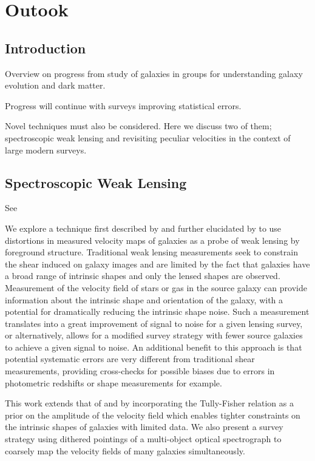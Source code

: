 \chapter{Outook}

\label{chap:outlook}

  
\section{Introduction}

Overview on progress from study of galaxies in groups for
understanding galaxy evolution and dark matter.

Progress will continue with surveys improving statistical errors.

Novel techniques must also be considered. Here we discuss two of them;
spectroscopic weak lensing and revisiting peculiar velocities in the
context of large modern surveys.

\section{Spectroscopic Weak Lensing}

See \citet{Huff2013}

We explore a technique first described by \citet{Blain2002} and
further elucidated by \citet{Morales2006} to use distortions in
measured velocity maps of galaxies as a probe of weak lensing by
foreground structure. Traditional weak lensing measurements seek to
constrain the shear induced on galaxy images and are limited by the
fact that galaxies have a broad range of intrinsic shapes and only the
lensed shapes are observed. Measurement of the velocity field of stars
or gas in the source galaxy can provide information about the
intrinsic shape and orientation of the galaxy, with a potential for
dramatically reducing the intrinsic shape noise. Such a measurement
translates into a great improvement of signal to noise for a given
lensing survey, or alternatively, allows for a modified survey
strategy with fewer source galaxies to achieve a given signal to
noise. An additional benefit to this approach is that potential
systematic errors are very different from traditional shear
measurements, providing cross-checks for possible biases due to errors
in photometric redshifts or shape measurements for example.

This work extends that of \citet{Blain2002} and \citet{Morales2006} by
incorporating the Tully-Fisher \citep{Tully1977} relation as a prior
on the amplitude of the velocity field which enables tighter
constraints on the intrinsic shapes of galaxies with limited data. We
also present a survey strategy using dithered pointings of a
multi-object optical spectrograph to coarsely map the velocity fields
of many galaxies simultaneously.

